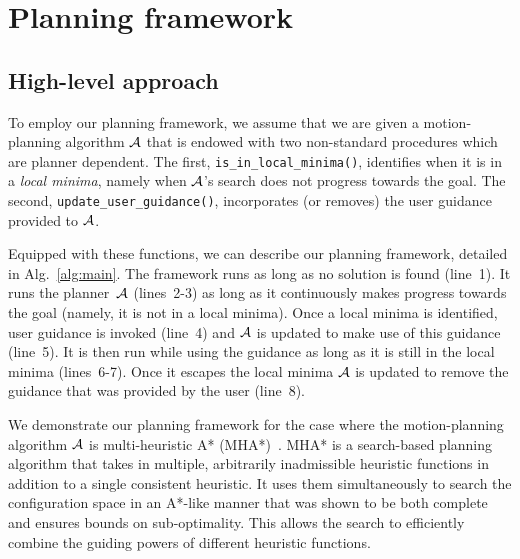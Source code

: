 \documentclass[conference]{IEEEtran}
\begin{document}
\section{Planning framework}
\label{sec:planning}
\subsection{High-level approach}
\label{sec:high}
To employ our planning framework, we assume that we are given a motion-planning algorithm $\mathcal{A}$ that is endowed with two non-standard procedures which are planner dependent.
The first, \texttt{is\_in\_local\_minima()}, 
identifies when it is in a \emph{local minima}, namely when $\mathcal{A}$'s search does not progress towards the goal. 
The second, \texttt{update\_user\_guidance()}, 
incorporates (or removes) the user guidance provided to $\mathcal{A}$. 

Equipped with these functions, we can describe our planning framework, detailed in Alg.~\ref{alg:main}.
The framework runs as long as no solution is found (line~1).
It runs the planner~$\mathcal{A}$ (lines~2-3) as long as it continuously makes progress towards the goal (namely, it is not in a local minima).
Once a local minima is identified, user guidance is invoked (line~4) and $\mathcal{A}$  is updated to make use of this guidance (line~5).
It is then run while using the guidance as long as it is still in the local minima (lines~6-7).
Once it escapes the local minima $\mathcal{A}$ is updated to remove the guidance that was provided by the user (line~8).


We demonstrate our planning framework for the case where the motion-planning algorithm $\mathcal{A}$ is multi-heuristic A* (MHA*)~\cite{ASNHL16}.
MHA* is a search-based planning algorithm that takes in multiple, arbitrarily inadmissible heuristic functions in addition to a single consistent heuristic.
It uses them simultaneously to search the configuration space in an A*-like manner that was shown to be both complete and ensures bounds on sub-optimality. 
This allows the search to efficiently combine the guiding powers of different heuristic functions. 
\end{document}
